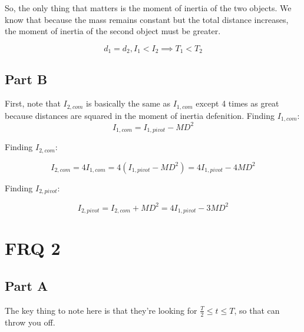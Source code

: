 \documentclass{article}
\begin{document}
So, the only thing that matters is the moment of inertia of the two objects. We know that because the mass remains constant but the total distance increases, the moment of inertia of the second object must be greater.

$$
d_1=d_2, I_1 < I_2 \implies T_1 < T_2
$$


\subsection{Part B}

First, note that $I_{2,com}$ is basically the same as $I_{1,com}$ except 4 times as great because distances are squared in the moment of inertia defenition. Finding $I_{1,com}$:
$$
I_{1,com} = I_{1,pivot} - MD^2
$$

Finding $I_{2,com}$:

$$
I_{2,com} = 4 I_{1,com} = 4(I_{1,pivot} - MD^2) = 4I_{1,pivot} - 4MD^2
$$

Finding $I_{2,pivot}$:

$$
I_{2,pivot} = I_{2,com} + MD^2 = 4I_{1,pivot} - 3MD^2
$$

\section {FRQ 2}

\subsection {Part A}

The key thing to note here is that they're looking for $\frac{T}{2}\le t \le T$, so that can throw you off.

\vspace{0.4cm}
\end{document}
